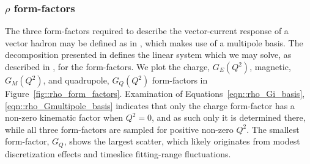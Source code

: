 \subsubsection{$\rho$ form-factors}



The three form-factors required to describe the vector-current response of a vector hadron may be defined as in , which makes use of a multipole basis. The decomposition presented in  defines the linear system which we may solve, as described in , for the form-factors. We plot the charge, $G_E(Q^2)$, magnetic, $G_M(Q^2)$, and quadrupole, $G_Q(Q^2)$ form-factors in Figure~\ref{fig::rho_form_factors}. Examination of Equations~\ref{eqn::rho_Gi_basis}, \ref{eqn::rho_Gmultipole_basis} indicates that only the charge form-factor has a non-zero kinematic factor when $Q^2=0$, and as such only it is determined there, while all three form-factors are sampled for positive non-zero $Q^2$. The smallest form-factor, $G_Q$, shows the largest scatter, which likely originates from modest discretization effects and timeslice fitting-range fluctuations.



